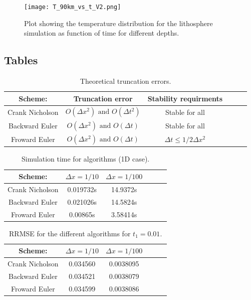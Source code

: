 \documentclass{article}
\begin{document}
\begin{figure}[H]
	\centering
	\texttt{[image: T\_90km\_vs\_t\_V2.png]}
	\caption{Plot showing the temperature distribution for the lithosphere simulation as function of time for different depths.}
	\label{fig:T_90_vs_t}
\end{figure}

\subsection{Tables}


\begin{table}[H]
\begin{center}
\caption{Theoretical truncation errors.}
\begin{tabular}{  |c|c|c|c|c|c| } \hline
Scheme:&	Truncation error&Stability requirments \\ \hline
Crank Nicholson&$O(\Delta x^2) \text{ and } O(\Delta t^2)$&Stable for all\\ \hline
Backward Euler&$O(\Delta x^2)  \text{ and } O(\Delta t)$&Stable for all\\ \hline
Froward Euler&$O(\Delta x^2)  \text{ and } O(\Delta t)$&$\Delta t \leq 1/2\Delta x^2$\\ \hline
\end{tabular}
\label{tab:a}
\end{center}
\end{table}

\begin{table}[H]
\begin{center}
\caption{Simulation time for algorithms (1D case).}
\begin{tabular}{  |c|c|c|c|c|c| } \hline
Scheme:&	$\Delta x = 1/10$&$\Delta x = 1/100$ \\ \hline
Crank Nicholson&0.019732s&14.9372s\\ \hline
Backward Euler&0.021026s&14.5824s\\ \hline
Froward Euler&	0.00865s&3.58414s\\ \hline
\end{tabular}
\label{tab:time}
\end{center}
\end{table}

\begin{table}[H]
\begin{center}
\caption{RRMSE for the different algorithms for $t_1=0.01$.}
\begin{tabular}{  |c|c|c|c|c|c| } \hline
Scheme:&	$\Delta x =1/10$&$\Delta x = 1/100$ \\ \hline
Crank Nicholson&0.034560&0.0038095\\ \hline
Backward Euler&0.034521&0.0038079\\ \hline
Froward Euler&0.034599&0.0038086\\ \hline
\end{tabular}
\label{tab:error}
\end{center}
\end{table}
\end{document}
